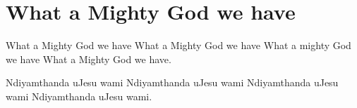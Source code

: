 \starttocol
\chapter{What a Mighty God we have}
\nexttocol
\hfill{\it }
\stoptocol
\starttocol
\startlines
{\sc What} a Mighty God we have
What a Mighty God we have
What a mighty God we have
What a Mighty God we have.

Ndiyamthanda uJesu wami
Ndiyamthanda uJesu wami
Ndiyamthanda uJesu wami
Ndiyamthanda uJesu wami.
\stoplines
\nexttocol

\stoptocol
